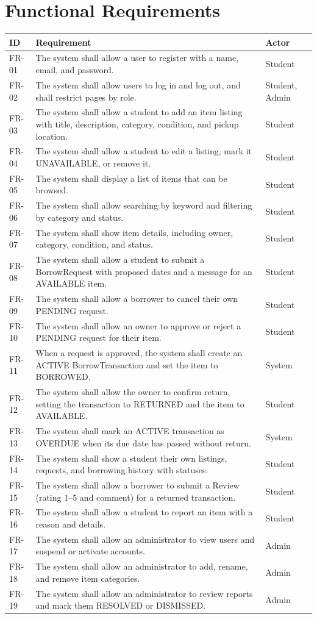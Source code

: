 \documentclass[11pt,a4paper]{article}
\begin{document}
\section{Functional Requirements}
\begin{longtable}{@{}l p{9.2cm} l@{}}
\toprule
\textbf{ID} & \textbf{Requirement} & \textbf{Actor}\\
\midrule
\endhead
FR-01 & The system shall allow a user to register with a name, email, and password. & Student\\
FR-02 & The system shall allow users to log in and log out, and shall restrict pages by role. & Student, Admin\\
FR-03 & The system shall allow a student to add an item listing with title, description, category, condition, and pickup location. & Student\\
FR-04 & The system shall allow a student to edit a listing, mark it UNAVAILABLE, or remove it. & Student\\
FR-05 & The system shall display a list of items that can be browsed. & Student\\
FR-06 & The system shall allow searching by keyword and filtering by category and status. & Student\\
FR-07 & The system shall show item details, including owner, category, condition, and status. & Student\\
FR-08 & The system shall allow a student to submit a BorrowRequest with proposed dates and a message for an AVAILABLE item. & Student\\
FR-09 & The system shall allow a borrower to cancel their own PENDING request. & Student\\
FR-10 & The system shall allow an owner to approve or reject a PENDING request for their item. & Student\\
FR-11 & When a request is approved, the system shall create an ACTIVE BorrowTransaction and set the item to BORROWED. & System\\
FR-12 & The system shall allow the owner to confirm return, setting the transaction to RETURNED and the item to AVAILABLE. & Student\\
FR-13 & The system shall mark an ACTIVE transaction as OVERDUE when its due date has passed without return. & System\\
FR-14 & The system shall show a student their own listings, requests, and borrowing history with statuses. & Student\\
FR-15 & The system shall allow a borrower to submit a Review (rating 1--5 and comment) for a returned transaction. & Student\\
FR-16 & The system shall allow a student to report an item with a reason and details. & Student\\
FR-17 & The system shall allow an administrator to view users and suspend or activate accounts. & Admin\\
FR-18 & The system shall allow an administrator to add, rename, and remove item categories. & Admin\\
FR-19 & The system shall allow an administrator to review reports and mark them RESOLVED or DISMISSED. & Admin\\
\bottomrule
\end{longtable}
\end{document}
